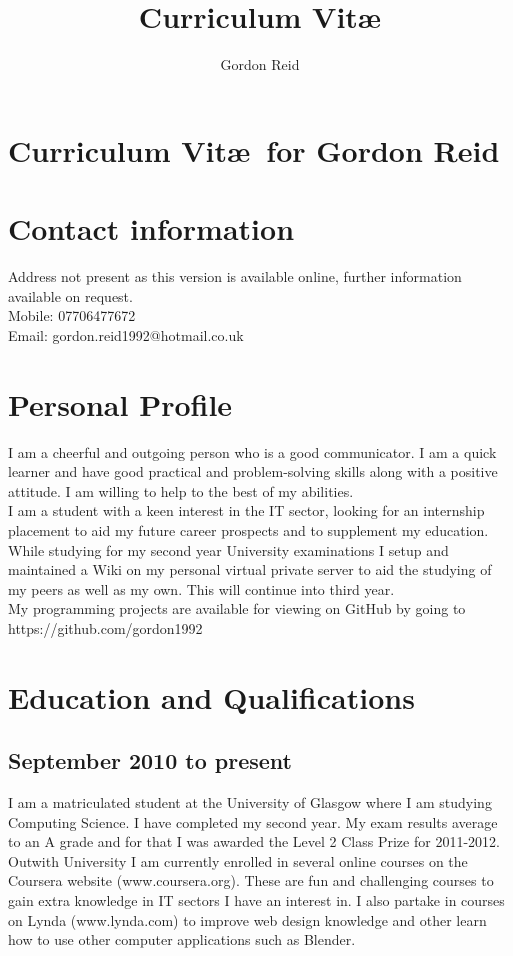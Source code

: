 \documentclass[10pt,a4paper]{article}
\title{Curriculum Vit\ae}
\author{Gordon Reid}
\begin{document}
\section*{Curriculum Vit\ae\ for Gordon Reid}
\section*{Contact information}
Address not present as this version is available online, further information available on request.\\
Mobile: 07706477672\\
Email: gordon.reid1992@hotmail.co.uk
\section*{Personal Profile}
I am a cheerful and outgoing person who is a good communicator. I am a quick learner and have good practical and problem-solving skills along with a positive attitude. I am willing to help to the best of my abilities.\\
I am a student with a keen interest in the IT sector, looking for an internship placement to aid my future career prospects and to supplement my education.\\
While studying for my second year University examinations I setup and maintained a Wiki on my personal virtual private server to aid the studying of my peers as well as my own. This will continue into third year.\\
My programming projects are available for viewing on GitHub by going to https://github.com/gordon1992
\section*{Education and Qualifications}
\subsection*{September 2010 to present}
I am a matriculated student at the University of Glasgow where I am studying Computing Science. I have completed my second year. My exam results average to an A grade and for that I was awarded the Level 2 Class Prize for 2011-2012.\\
Outwith University I am currently enrolled in several online courses on the Coursera website (www.coursera.org). These are fun and challenging courses to gain extra knowledge in IT sectors I have an interest in. I also partake in courses on Lynda (www.lynda.com) to improve web design knowledge and other learn how to use other computer applications such as Blender.
\end{document}
